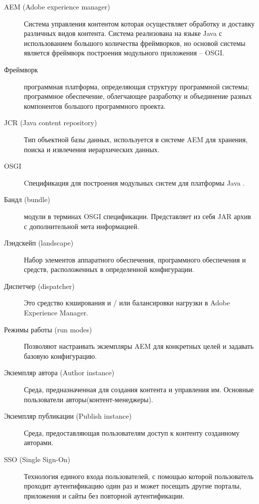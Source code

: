 \Abbreviations %
\begin{description}
\item[AEM (Adobe experience manager)] Система управления контентом которая осуществляет обработку и доставку различных видов контента. Система реализована на языке Java с использованием большого количества фреймворков, но основой системы является фреймворк построения модульного приложения – OSGI.
\item[Фреймворк] программная платформа, определяющая структуру программной системы; программное обеспечение, облегчающее разработку и объединение разных компонентов большого программного проекта.
\item[JCR (Java content repository)] Тип объектной базы данных, используется в системе AEM для хранения, поиска и извлечения иерархических данных.
\item[OSGI] Cпецификация для построения модульных систем для платформы Java \cite{web:osgiSite}.
\item[Бандл (bundle)] модули в терминах OSGI спецификации. Представляет из себя JAR архив с дополнительной мета информацией.
\item[Лэндскейп (landscape)] Набор элементов аппаратного обеспечения, программного обеспечения и средств, расположенных в определенной конфигурации.
\item[Диспетчер (dispatcher)] Это средство кэширования и / или балансировки нагрузки в Adobe Experience Manager.
\item[Режимы работы (run modes)] Позволяют настраивать экземпляры AEM для конкретных целей и задавать базовую конфигурацию.
\item[Экземпляр автора (Author instance)] Среда, предназначенная для создания контента и управления им. Основные пользователи авторы(контент-менеджеры).
\item[Экземпляр публикации (Publish instance)] Среда, предоставляющая пользователям доступ к контенту созданному авторами.
\item[SSO (Single Sign-On)] Технология единого входа пользователей, с помощью которой пользователь проходит аутентификацию один раз и может посещать другие порталы, приложения и сайты без повторной аутентификации.

\end{description}
